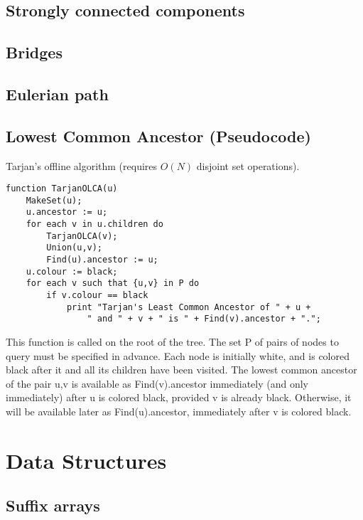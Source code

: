 \documentclass[9pt]{extarticle}
\begin{document}
\begin{multicols}{3}
\subsection{Strongly connected components}


\subsection{Bridges}


\subsection{Eulerian path}


\subsection{Lowest Common Ancestor (Pseudocode)}
Tarjan's offline algorithm (requires $O(N)$ disjoint set operations).
\begin{lstlisting}
function TarjanOLCA(u)
    MakeSet(u);
    u.ancestor := u;
    for each v in u.children do
        TarjanOLCA(v);
        Union(u,v);
        Find(u).ancestor := u;
    u.colour := black;
    for each v such that {u,v} in P do
        if v.colour == black
            print "Tarjan's Least Common Ancestor of " + u +
                " and " + v + " is " + Find(v).ancestor + ".";
\end{lstlisting}
This function is called on the root of the tree. The set P of pairs of nodes to query must be specified in advance. Each node is initially white, and is colored black after it and all its children have been visited. The lowest common ancestor of the pair {u,v} is available as Find(v).ancestor immediately (and only immediately) after u is colored black, provided v is already black. Otherwise, it will be available later as Find(u).ancestor, immediately after v is colored black.

\section{Data Structures}

\subsection{Suffix arrays}



\end{multicols}
\end{document}

